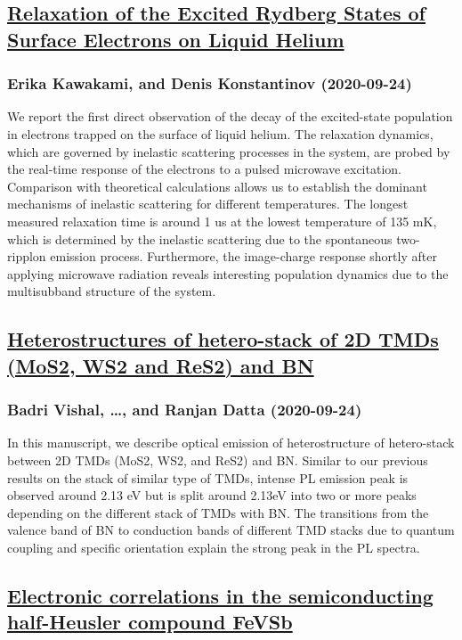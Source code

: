 \subsection*{\href{http://arxiv.org/abs/2009.11502v1}{Relaxation of the Excited Rydberg States of Surface Electrons on Liquid  Helium}}
\subsubsection*{Erika Kawakami, and Denis Konstantinov (2020-09-24)}
We report the first direct observation of the decay of the excited-state
population in electrons trapped on the surface of liquid helium. The relaxation
dynamics, which are governed by inelastic scattering processes in the system,
are probed by the real-time response of the electrons to a pulsed microwave
excitation. Comparison with theoretical calculations allows us to establish the
dominant mechanisms of inelastic scattering for different temperatures. The
longest measured relaxation time is around 1 us at the lowest temperature of
135 mK, which is determined by the inelastic scattering due to the spontaneous
two-ripplon emission process. Furthermore, the image-charge response shortly
after applying microwave radiation reveals interesting population dynamics due
to the multisubband structure of the system.

\subsection*{\href{http://arxiv.org/abs/2009.11495v1}{Heterostructures of hetero-stack of 2D TMDs (MoS2, WS2 and ReS2) and BN}}
\subsubsection*{Badri Vishal, \dots, and Ranjan Datta (2020-09-24)}
In this manuscript, we describe optical emission of heterostructure of
hetero-stack between 2D TMDs (MoS2, WS2, and ReS2) and BN. Similar to our
previous results on the stack of similar type of TMDs, intense PL emission peak
is observed around 2.13 eV but is split around 2.13eV into two or more peaks
depending on the different stack of TMDs with BN. The transitions from the
valence band of BN to conduction bands of different TMD stacks due to quantum
coupling and specific orientation explain the strong peak in the PL spectra.

\subsection*{\href{http://arxiv.org/abs/2009.11489v2}{Electronic correlations in the semiconducting half-Heusler compound  FeVSb}}
